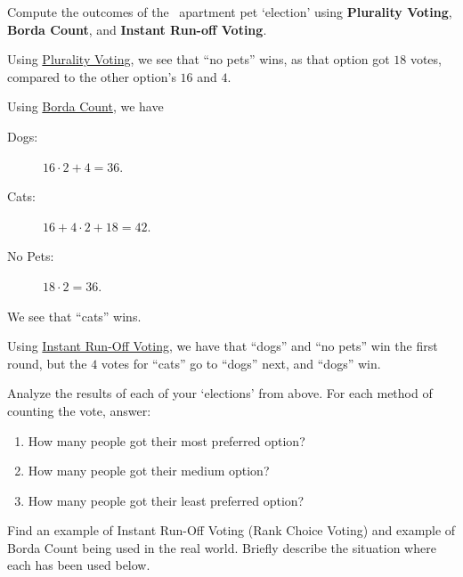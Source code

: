 \documentclass[nooutcomes,noauthor,hints,handout]{ximera}
\begin{document}
\mynewpage




\begin{question}
  Compute the outcomes of the \mooculus~apartment pet `election'
  using \textbf{Plurality Voting}, \textbf{Borda Count}, and
  \textbf{Instant Run-off Voting}.
  \begin{freeResponse}
    Using \underline{Plurality Voting}, we see that ``no pets'' wins, as that
    option got $18$ votes, compared to the other option's $16$ and
    $4$.


    
    Using \underline{Borda Count}, we have
    \begin{description}
      \item[Dogs:] $16\cdot 2 + 4 = 36$.
      \item[Cats:] $16 +4\cdot 2+18 =42$.
      \item[No Pets:] $18\cdot 2 = 36$.
    \end{description}
  \end{freeResponse}
  We see that ``cats'' wins.

  

  Using \underline{Instant Run-Off Voting}, we have that ``dogs'' and
  ``no pets'' win the first round, but the $4$ votes for ``cats'' go
  to ``dogs'' next, and ``dogs'' win.
\end{question}
\mynewpage



\begin{question}
  Analyze the results of each of your `elections' from above. For each
  method of counting the vote, answer:
  \begin{enumerate}
  \item How many people got their most preferred option?
  \item How many people got their medium option? 
  \item How many people got their least preferred option?
  \end{enumerate}
\end{question}
\mynewpage








\begin{question}
  Find an example of Instant Run-Off Voting (Rank Choice Voting) and
  example of Borda Count being used in the real world. Briefly
  describe the situation where each has been used below.
    
\end{question}
\end{document}

